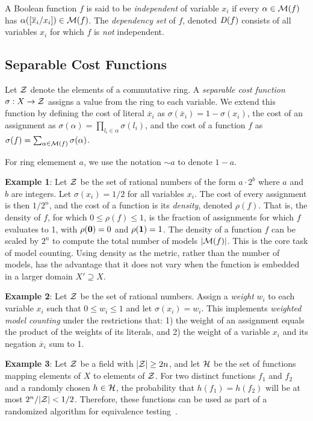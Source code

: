 \documentclass{llncs}
\newcommand{\one}{\mbox{\bf 1}}
\newcommand{\zero}{\mbox{\bf 0}}
\newcommand{\obar}[1]{\overline{#1}}
\newcommand{\oneminus}{{\sim}}
\newcommand{\interp}{\alpha}
\newcommand{\interpset}[1]{{\cal M}(#1)}
\newcommand{\ring}{{\cal Z}}
\newcommand{\cost}{\sigma}
\newcommand{\density}{\rho}
\newcommand{\hashset}{{\cal H}}
\newcommand{\fhash}{h}
\newcommand{\depend}{{\it D}}
\newcommand{\subs}[2]{[#2/#1]}
\begin{document}
A Boolean function $f$ is said to be {\em independent} of variable
$x_i$ if every $\interp \in \interpset{f}$ has
$\interp(\subs{x_i}{\obar{x}_i}) \in \interpset{f}$.
The {\em dependency set} of $f$, denoted
$\depend(f)$ consists of all variables $x_i$ for which $f$ is {\em
  not} independent.

\subsection{Separable Cost Functions}

Let $\ring$ denote the elements of a commutative ring.  A {\em
  separable cost function} $\cost:X \rightarrow \ring$ assigns a value
from the ring to each variable.  We extend this function by defining
the cost of literal $\obar{x}_i$ as $\cost(\obar{x}_i) = 1 - \cost(x_i)$, the cost
of an assignment as
$\cost(\interp) = \prod_{l_i \in \interp} \cost(l_i)$,
and the cost of a function $f$ as
$\cost(f) = \sum_{\interp \in \interpset{f}} \cost(\interp)$.

For ring elemement $a$, we use the notation $\oneminus a$ to denote $1 - a$.

{\bf Example 1}: Let $\ring$ be the set of rational numbers of the form $a\cdot 2^b$ where $a$ and $b$ are integers.
Let $\cost(x_i) = 1/2$ for all variables $x_i$.  The cost of every
assignment is then $1/2^{n}$, and the cost of a function is its
{\em density}, denoted $\density(f)$.  That is, the density of $f$, for which
$0 \leq \density(f) \leq 1$, 
is the fraction of assignments for which $f$
evaluates to 1, with $\density(\zero) = 0$ and $\density(\one) = 1$.  The density of a function
$f$ can be scaled by $2^n$ to compute the total number of models
$|\interpset{f}|$.  This is the core task of model counting.  Using
density as the metric, rather than the number of models, has the advantage that it does not vary when the
function is embedded in a larger domain $X' \supseteq X$.  

{\bf Example 2}: Let $\ring$ be the set of rational numbers.  Assign a
{\em weight} $w_i$ to each variable $x_i$ such that $0 \leq w_i \leq
1$ and let $\cost(x_i) = w_i$.  This implements {\em weighted model counting}
under the restrictions that: 
1) the
weight of an assignment equals the product of the weights of its
literals, and 2) the weight of a variable $x_i$ and its negation
$\obar{x}_i$ sum to 1.


{\bf Example 3}: Let $\ring$ be a field with $|\ring| \geq 2n$,
and let $\hashset$ be the set of functions
mapping elements of $X$ to elements of $\ring$.  For
two distinct functions $f_1$ and $f_2$ and a randomly chosen $\fhash
\in \hashset$, the probability that $h(f_1) = h(f_2)$ will be at most
$2^n/|\ring|< 1/2$.  Therefore, these functions can be used as part of a
randomized algorithm for equivalence testing~\cite{blum:ipl:1980}.
\end{document}
